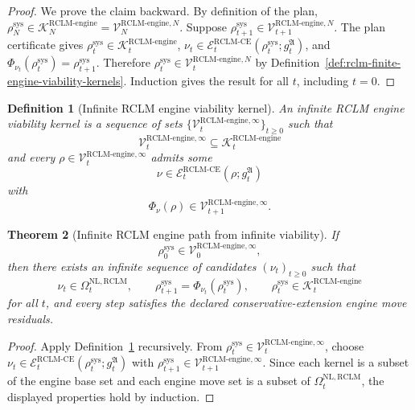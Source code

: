 \documentclass[11pt,a4paper]{article}
\newtheorem{theorem}{Theorem}[section]
\newtheorem{definition}[theorem]{Definition}
\newcommand{\Kcal}{\mathcal K}
\newcommand{\Vcal}{\mathcal V}
\newcommand{\RCLM}{\mathrm{RCLM}}
\newcommand{\sys}{\mathrm{sys}}
\newcommand{\engine}{\mathrm{engine}}
\newcommand{\NL}{\mathrm{NL}}
\newcommand{\CE}{\mathrm{CE}}
\begin{document}
\begin{proof}
We prove the claim backward.  By definition of the plan, \(\rho_N^{\sys}\in\Kcal_N^{\RCLM\text{-}\engine}=\Vcal_N^{\RCLM\text{-}\engine,N}\).  Suppose \(\rho_{t+1}^{\sys}\in\Vcal_{t+1}^{\RCLM\text{-}\engine,N}\).  The plan certificate gives \(\rho_t^{\sys}\in\Kcal_t^{\RCLM\text{-}\engine}\), \(\nu_t\in\mathcal E_t^{\RCLM\text{-}\CE}(\rho_t^{\sys};g_t^{\mathfrak A})\), and \(\Phi_{\nu_t}(\rho_t^{\sys})=\rho_{t+1}^{\sys}\).  Therefore \(\rho_t^{\sys}\in\Vcal_t^{\RCLM\text{-}\engine,N}\) by Definition~\ref{def:rclm-finite-engine-viability-kernels}.  Induction gives the result for all \(t\), including \(t=0\).
\end{proof}

\begin{definition}[Infinite RCLM engine viability kernel]
\label{def:rclm-infinite-engine-viability-kernel}
An infinite RCLM engine viability kernel is a sequence of sets \(\{\Vcal_t^{\RCLM\text{-}\engine,\infty}\}_{t\ge0}\) such that
\[
\Vcal_t^{\RCLM\text{-}\engine,\infty}
\subseteq
\Kcal_t^{\RCLM\text{-}\engine}
\]
and every \(\rho\in\Vcal_t^{\RCLM\text{-}\engine,\infty}\) admits some
\[
\nu\in\mathcal E_t^{\RCLM\text{-}\CE}(\rho;g_t^{\mathfrak A})
\]
with
\[
\Phi_\nu(\rho)
\in
\Vcal_{t+1}^{\RCLM\text{-}\engine,\infty}.
\]
\end{definition}

\begin{theorem}[Infinite RCLM engine path from infinite viability]
\label{thm:rclm-infinite-engine-path}
If
\[
\rho_0^{\sys}\in\Vcal_0^{\RCLM\text{-}\engine,\infty},
\]
then there exists an infinite sequence of candidates \((\nu_t)_{t\ge0}\) such that
\[
\nu_t\in\Omega_t^{\NL,\RCLM},
\qquad
\rho_{t+1}^{\sys}=\Phi_{\nu_t}(\rho_t^{\sys}),
\qquad
\rho_t^{\sys}\in\Kcal_t^{\RCLM\text{-}\engine}
\]
for all \(t\), and every step satisfies the declared conservative-extension engine move residuals.
\end{theorem}

\begin{proof}
Apply Definition~\ref{def:rclm-infinite-engine-viability-kernel} recursively.  From \(\rho_t^{\sys}\in\Vcal_t^{\RCLM\text{-}\engine,\infty}\), choose \(\nu_t\in\mathcal E_t^{\RCLM\text{-}\CE}(\rho_t^{\sys};g_t^{\mathfrak A})\) with \(\rho_{t+1}^{\sys}\in\Vcal_{t+1}^{\RCLM\text{-}\engine,\infty}\).  Since each kernel is a subset of the engine base set and each engine move set is a subset of \(\Omega_t^{\NL,\RCLM}\), the displayed properties hold by induction.
\end{proof}
\end{document}
